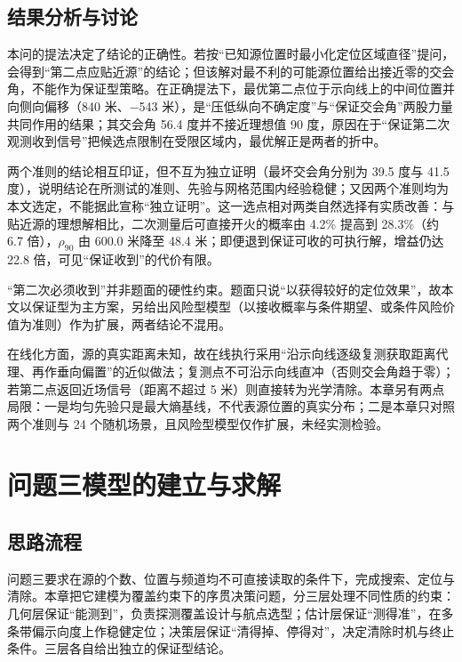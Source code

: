 \documentclass[12pt,a4paper]{ctexart}
\begin{document}
\FloatBarrier

\subsection{结果分析与讨论}

本问的提法决定了结论的正确性。若按“已知源位置时最小化定位区域直径”提问，会得到“第二点应贴近源”的结论；但该解对最不利的可能源位置给出接近零的交会角，不能作为保证型策略。在正确提法下，最优第二点位于示向线上的中间位置并向侧向偏移（840 米、$-$543 米），是“压低纵向不确定度”与“保证交会角”两股力量共同作用的结果；其交会角 56.4 度并不接近理想值 90 度，原因在于“保证第二次观测收到信号”把候选点限制在受限区域内，最优解正是两者的折中。

两个准则的结论相互印证，但不互为独立证明（最坏交会角分别为 39.5 度与 41.5 度），说明结论在所测试的准则、先验与网格范围内经验稳健；又因两个准则均为本文选定，不能据此宣称“独立证明”。这一选点相对两类自然选择有实质改善：与贴近源的理想解相比，二次测量后可直接开火的概率由 4.2\% 提高到 28.3\%（约 6.7 倍），$\rho_{90}$ 由 600.0 米降至 48.4 米；即便退到保证可收的可执行解，增益仍达 22.8 倍，可见“保证收到”的代价有限。

“第二次必须收到”并非题面的硬性约束。题面只说“以获得较好的定位效果”，故本文以保证型为主方案，另给出风险型模型（以接收概率与条件期望、或条件风险价值为准则）作为扩展，两者结论不混用。

在线化方面，源的真实距离未知，故在线执行采用“沿示向线逐级复测获取距离代理、再作垂向偏置”的近似做法；复测点不可沿示向线直冲（否则交会角趋于零）；若第二点返回近场信号（距离不超过 5 米）则直接转为光学清除。本章另有两点局限：一是均匀先验只是最大熵基线，不代表源位置的真实分布；二是本章只对照两个准则与 24 个随机场景，且风险型模型仅作扩展，未经实测检验。

\FloatBarrier

\section{问题三模型的建立与求解}

\subsection{思路流程}

问题三要求在源的个数、位置与频道均不可直接读取的条件下，完成搜索、定位与清除。本章把它建模为覆盖约束下的序贯决策问题，分三层处理不同性质的约束：几何层保证“能测到”，负责探测覆盖设计与航点选型；估计层保证“测得准”，在多条带偏示向度上作稳健定位；决策层保证“清得掉、停得对”，决定清除时机与终止条件。三层各自给出独立的保证型结论。
\end{document}
